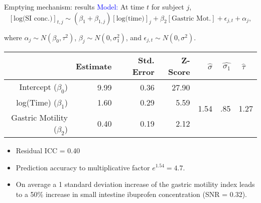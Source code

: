 \documentclass[handout]{beamer}
\begin{document}
\begin{frame}{Emptying mechanism: results}
\small
\textcolor{blue}{Model:} At time $t$ for subject $j$, $$[\text{log(SI conc.)}]_{t,j} \sim (\beta_1 + \beta_{1,j})[\text{log(time)}]_j + \beta_2[\text{Gastric Mot.}] + \epsilon_{j,t} + \alpha_j,$$

where $\alpha_j \sim N(\beta_0, \tau^2)$, $\beta_j \sim N(0, \sigma_1^2)$, and $\epsilon_{j,t} \sim N(0, \sigma^2)$.%

\footnotesize
\begin{table}[ht]
\centering
\begin{tabular}{rrrr||rrr}
  \hline
 & Estimate & Std. Error & Z-Score & $\hat{\sigma}$ & $\hat{\sigma_1}$ & $\hat{\tau}$ \ \\ 
  \hline
Intercept ($\beta_0$) & 9.99 & 0.36 & 27.90 & \multirow{3}{*}{1.54}& \multirow{3}{*}{.85}& \multirow{3}{*}{1.27}\\ 
  log(Time) ($\beta_1$) & 1.60 & 0.29 & 5.59 & & &\\ 
  Gastric Motility ($\beta_2$) & 0.40 & 0.19 & 2.12 & & & \\ 
   \hline
\end{tabular}
\end{table}

\small
\begin{itemize}
	\item Residual ICC = 0.40
	\item Prediction accuracy to multiplicative factor $e^{1.54} = 4.7$.
	\item On average a 1 standard deviation increase of the gastric motility index leads to a 50\% increase in small intestine ibuprofen concentration (SNR = 0.32).
\end{itemize}

\end{frame}
\end{document}
